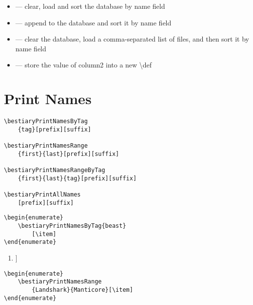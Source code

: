 \documentclass[itdr]{subfiles}
\begin{document}
\begin{minipage}{\textwidth}
\begin{itemize}
	\item {} --- clear, load and sort the database by name field
	\item {} --- append to the database and sort it by name field
	\item {} --- clear the database, load a comma-separated list of files, and then sort it by name field
	\item {} --- store the value of column2 into a new \textbackslash{}def
\end{itemize}

\end{minipage}

\vfill
\clearpage

\section{Print Names}

\begin{lstlisting}
\bestiaryPrintNamesByTag
	{tag}[prefix][suffix]

\bestiaryPrintNamesRange
	{first}{last}[prefix][suffix]

\bestiaryPrintNamesRangeByTag
	{first}{last}{tag}[prefix][suffix]

\bestiaryPrintAllNames
	[prefix][suffix]
\end{lstlisting}

\begin{lstlisting}
\begin{enumerate}
	\bestiaryPrintNamesByTag{beast}
		[\item]
\end{enumerate}
\end{lstlisting}

\begin{enumerate}
	[\item]
\end{enumerate}

\vfill

\begin{lstlisting}
\begin{enumerate}
	\bestiaryPrintNamesRange
		{Landshark}{Manticore}[\item]
\end{enumerate}
\end{lstlisting}
\end{document}
